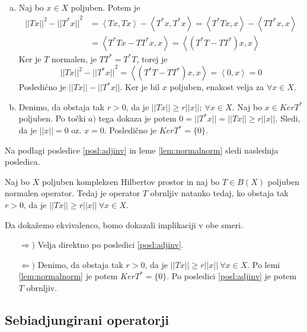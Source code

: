 \documentclass[mat2]{matdelo}
\newcommand{\abs}[1]{\ensuremath{\lvert #1 \rvert}}
\newcommand{\norm}[1]{\abs{\abs{#1}}}
\newcommand{\Sp}[2]{\ensuremath{\left<#1, #2\right>}}
\begin{document}
			\begin{dokaz}
				\begin{enumerate}[a)]
					\item Naj bo $x\in X$ poljuben. Potem je \begin{align*}
						\norm{Tx}^2 - \norm{T^*x}^2 &= \Sp{Tx}{Tx} - \Sp{T^*x}{T^*x} = \Sp{T^*Tx}{x} - \Sp{TT^*x}{x}\\
						&= \Sp{T^*Tx - TT^*x}{x} = \Sp{(T^*T - TT^*)x}{x}
					\end{align*}
					Ker je $T$ normalen, je $TT^* = T^*T$, torej je $$\norm{Tx}^2 - \norm{T^*x}^2 = \Sp{(T^*T - TT^*)x}{x} = \Sp{0}{x} = 0 $$
					Posledično je $\norm{Tx} - \norm{T^*x}$. Ker je bil $x$ poljuben, enakost velja za $\forall x\in X$.
					\item Denimo, da obstaja tak $r>0$, da je $\norm{Tx} \geq r\norm{x};~\forall x\in X$. Naj bo $x\in KerT^*$ poljuben. Po točki $a)$ tega dokaza je potem $0 = \norm{T^*x} = \norm{Tx} \geq r\norm{x}$. Sledi, da je $\norm{x} = 0$ oz. $x = 0$. Posledično je $KerT^* = \{0\}$.
				\end{enumerate}
			\end{dokaz}
			
			Na podlagi posledice \ref{posl:adjinv} in leme \ref{lem:normalnorm} sledi naslednja posledica.
			
			\begin{posledica}
				\label{posl:normalinv}
				Naj bo $X$ poljuben kompleksen Hilbertov prostor in naj bo $T\in B(X)$ poljuben normalen operator. Tedaj je operator $T$ obrnljiv natanko tedaj, ko obstaja tak $r > 0$, da je $\norm{Tx} \geq r\norm{x}~\forall x\in X$.
			\end{posledica}
			
			\begin{dokaz}
				Da dokažemo ekvivalenco, bomo dokazali implikaciji v obe smeri.
				\begin{itemize}
					\item[$\Rightarrow)$] Velja direktno po posledici \ref{posl:adjinv}.
					\item[$\Leftarrow)$] Denimo, da obstaja tak $r>0$, da je $\norm{Tx} \geq r\norm{x}~\forall x\in X$. Po lemi \ref{lem:normalnorm} je potem $KerT^* = \{0\}$. Po posledici \ref{posl:adjinv} je potem $T$ obrnljiv.
				\end{itemize}
			\end{dokaz}
			
			\subsection{Sebiadjungirani operatorji}
			
\end{document}
